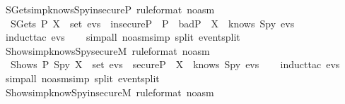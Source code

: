 \begin{isabellebody}
  \isamarkupfalse%
  \ SGets{\isacharunderscore}imp{\isacharunderscore}knows{\isacharunderscore}Spy{\isacharunderscore}insecureP\ {\isacharbrackleft}rule{\isacharunderscore}format\ {\isacharparenleft}no{\isacharunderscore}asm{\isacharparenright}{\isacharbrackright}\ {\isacharcolon}\isanewline
  \ \ {\isachardoublequoteopen}SGets\ P\ X\ {\isasymin}\ set\ evs\ {\isasymlongrightarrow}\ {\isacharparenleft}insecureP\ {\isasymand}\ P\ {\isasymin}\ badP{\isacharparenright}\ {\isasymlongrightarrow}\ X\ {\isasymin}\ knows\ Spy\ evs{\isachardoublequoteclose}\ \isanewline
  \isadelimproof
  \isanewline
  \ \ %
  \endisadelimproof
  \isatagproof
  \isamarkupfalse%
  \ {\isacharparenleft}induct{\isacharunderscore}tac\ {\isachardoublequoteopen}evs{\isachardoublequoteclose}{\isacharparenright}\isanewline
  \ \ \isamarkupfalse%
  \ {\isacharparenleft}simp{\isacharunderscore}all\ {\isacharparenleft}no{\isacharunderscore}asm{\isacharunderscore}simp{\isacharparenright}\ split{\isacharcolon}\ event{\isachardot}split{\isacharparenright}\isanewline
  \isamarkupfalse%
  \endisatagproof
  {\isafoldproof}%
  \isadelimproof
  \isanewline
  \endisadelimproof
  \isanewline
  \isamarkupfalse%
  \ Shows{\isacharunderscore}imp{\isacharunderscore}knows{\isacharunderscore}Spy{\isacharunderscore}secureM\ {\isacharbrackleft}rule{\isacharunderscore}format\ {\isacharparenleft}no{\isacharunderscore}asm{\isacharparenright}{\isacharbrackright}\ {\isacharcolon}\isanewline
  \ \ {\isachardoublequoteopen}Shows\ P\ Spy\ X\ {\isasymin}\ set\ evs\ {\isasymlongrightarrow}\ secureP\ {\isasymlongrightarrow}\ X\ {\isasymin}\ knows\ Spy\ evs{\isachardoublequoteclose}\isanewline
  \isadelimproof
  \isanewline
  \ \ %
  \endisadelimproof
  \isatagproof
  \isamarkupfalse%
  \ {\isacharparenleft}induct{\isacharunderscore}tac\ {\isachardoublequoteopen}evs{\isachardoublequoteclose}{\isacharparenright}\isanewline
  \ \ \isamarkupfalse%
  \ {\isacharparenleft}simp{\isacharunderscore}all\ {\isacharparenleft}no{\isacharunderscore}asm{\isacharunderscore}simp{\isacharparenright}\ split{\isacharcolon}\ event{\isachardot}split{\isacharparenright}\isanewline
  \isamarkupfalse%
  \endisatagproof
  {\isafoldproof}%
  \isadelimproof
  \isanewline
  \endisadelimproof
  \isanewline
  \isamarkupfalse%
  \ Shows{\isacharunderscore}imp{\isacharunderscore}know{\isacharunderscore}Spy{\isacharunderscore}insecureM\ {\isacharbrackleft}rule{\isacharunderscore}format\ {\isacharparenleft}no{\isacharunderscore}asm{\isacharparenright}{\isacharbrackright}\ {\isacharcolon}\isanewline

\end{isabellebody}
